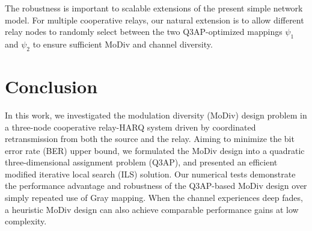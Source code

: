 \documentclass[journal,draftcls,onecolumn,12pt,twoside]{IEEEtran}
\begin{document}
The robustness is important to scalable extensions of the present simple network
model. For multiple cooperative relays, our natural extension is to allow
different relay nodes to randomly select between the two Q3AP-optimized mappings
$\psi_1$ and $\psi_2$ to ensure sufficient MoDiv and channel diversity. 

\section{Conclusion}
\label{sec:conclusion}
In this work, we investigated the modulation diversity (MoDiv) design problem in
a three-node cooperative relay-HARQ system driven by coordinated retransmission
from both the source and the relay. Aiming to minimize the bit error rate (BER)
upper bound, we formulated the MoDiv design into a quadratic three-dimensional
assignment problem (Q3AP), and presented an efficient modified iterative local
search (ILS) solution. Our numerical tests demonstrate the performance advantage
and robustness of the Q3AP-based MoDiv design over simply repeated use of
Gray mapping. When the channel experiences deep fades, a heuristic MoDiv design
can also achieve comparable performance gains at low complexity.













%




\end{document}
